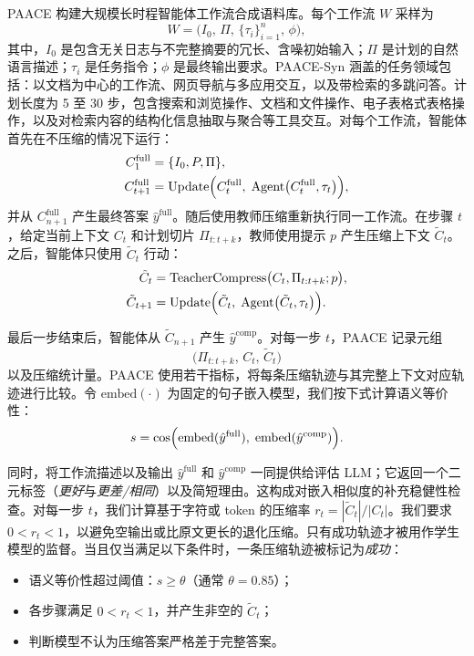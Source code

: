 \documentclass[10pt,twocolumn]{article}
\begin{document}
PAACE 构建大规模长时程智能体工作流合成语料库。每个工作流 $W$ 采样为
\[
W=\bigl(I_0,\,\Pi,\,\{\tau_i\}_{i=1}^{n},\,\phi\bigr),
\]
其中，$I_0$ 是包含无关日志与不完整摘要的冗长、含噪初始输入；$\Pi$ 是计划的自然语言描述；$\tau_i$ 是任务指令；$\phi$ 是最终输出要求。PAACE-Syn 涵盖的任务领域包括：以文档为中心的工作流、网页导航与多应用交互，以及带检索的多跳问答。计划长度为 5 至 30 步，包含搜索和浏览操作、文档和文件操作、电子表格式表格操作，以及对检索内容的结构化信息抽取与聚合等工具交互。对每个工作流，智能体首先在不压缩的情况下运行：
\begin{align}
C^{\mathrm{full}}_1&=\{I_0,P,\Pi\},\\
C^{\mathrm{full}}_{t+1}
&=\mathrm{Update}\Bigl(C^{\mathrm{full}}_t,\;
\mathrm{Agent}\bigl(C^{\mathrm{full}}_t,\tau_t\bigr)\Bigr),
\end{align}
并从 $C^{\mathrm{full}}_{n+1}$ 产生最终答案 $\hat{y}^{\mathrm{full}}$。随后使用教师压缩重新执行同一工作流。在步骤 $t$，给定当前上下文 $C_t$ 和计划切片 $\Pi_{t:t+k}$，教师使用提示 $p$ 产生压缩上下文 $\tilde{C}_t$。之后，智能体只使用 $\tilde{C}_t$ 行动：
\begin{align}
\tilde{C}_t&=\mathrm{TeacherCompress}\bigl(C_t,\Pi_{t:t+k};p\bigr),\\
\tilde{C}_{t+1}
&=\mathrm{Update}\Bigl(\tilde{C}_t,\;
\mathrm{Agent}\bigl(\tilde{C}_t,\tau_t\bigr)\Bigr).
\end{align}

最后一步结束后，智能体从 $\tilde{C}_{n+1}$ 产生 $\hat{y}^{\mathrm{comp}}$。对每一步 $t$，PAACE 记录元组
\[
\bigl(\Pi_{t:t+k},\,C_t,\,\tilde{C}_t\bigr)
\]
以及压缩统计量。PAACE 使用若干指标，将每条压缩轨迹与其完整上下文对应轨迹进行比较。令 $\mathrm{embed}(\cdot)$ 为固定的句子嵌入模型，我们按下式计算语义等价性：
\begin{equation}
s=\cos\Bigl(\mathrm{embed}(\hat{y}^{\mathrm{full}}),\;
\mathrm{embed}(\hat{y}^{\mathrm{comp}})\Bigr).
\end{equation}

同时，将工作流描述以及输出 $\hat{y}^{\mathrm{full}}$ 和 $\hat{y}^{\mathrm{comp}}$ 一同提供给评估 LLM；它返回一个二元标签（\emph{更好}与\emph{更差/相同}）以及简短理由。这构成对嵌入相似度的补充稳健性检查。对每一步 $t$，我们计算基于字符或 token 的压缩率 $r_t=|\tilde{C}_t|/|C_t|$。我们要求 $0<r_t<1$，以避免空输出或比原文更长的退化压缩。只有成功轨迹才被用作学生模型的监督。当且仅当满足以下条件时，一条压缩轨迹被标记为\emph{成功}：
\begin{itemize}
  \item 语义等价性超过阈值：$s\ge\theta$（通常 $\theta=0.85$）；
  \item 各步骤满足 $0<r_t<1$，并产生非空的 $\tilde{C}_t$；
  \item 判断模型不认为压缩答案严格差于完整答案。
\end{itemize}
\end{document}
